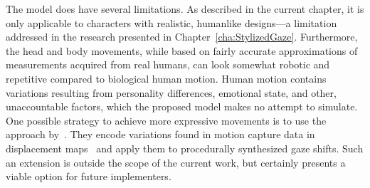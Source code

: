 The model does have several limitations. As described in the current chapter, it is only applicable to characters with realistic, humanlike designs---a limitation addressed in the research presented in Chapter~\ref{cha:StylizedGaze}. Furthermore, the head and body movements, while based on fairly accurate approximations of measurements acquired from real humans, can look somewhat robotic and repetitive compared to biological human motion. Human motion contains variations resulting from personality differences, emotional state, and other, unaccountable factors, which the proposed model makes no attempt to simulate. One possible strategy to achieve more expressive movements is to use the approach by~\citet{lance2010expressive}. They encode variations found in motion capture data in displacement maps~\citep{witkin1995motion} and apply them to procedurally synthesized gaze shifts. Such an extension is outside the scope of the current work, but certainly presents a viable option for future implementers. 
